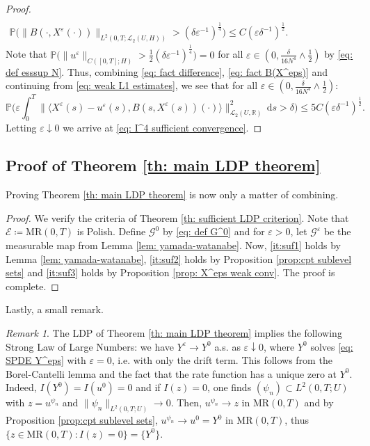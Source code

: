 \documentclass{amsart}
\newcommand{\dd}{\,\mathrm{d}}
\renewcommand{\MR}{\mathrm{MR}}
\newcommand{\UH}{\mathcal{L}_2(U,H)}
\newcommand{\<}{\langle}
\newcommand{\?}{\rangle}
\theoremstyle{plain}
\theoremstyle{remark}
\newtheorem{remark}[theorem]{Remark}
\theoremstyle{plain}
\numberwithin{equation}{section}
\def\R{{\mathbb R}}
\renewcommand{\P}{\mathbb{P}}
\newcommand{\eps}{\varepsilon}
\begin{document}
\begin{proof}
\begin{align}
      \label{eq: fact difference}
      \end{align}
      \begin{align}
    \P\big(\|B(\cdot,X^\eps(\cdot))\|_{L^2(0,T;\UH)}> ({\delta}{\eps}^{-1})^{\frac{1}{4}}\big)\leq C({\eps}{\delta}^{-1})^{\frac{1}{2}}.\hspace{5cm} \label{eq: fact B(X^eps)}
    \end{align}
    Note that  $\P\big(\|u^{\eps}\|_{C([0,T];H)}>\tfrac{1}{2}({\delta}{\eps}^{-1})^{\frac{1}{4}}\big)=0$ for all $\eps\in(0,\frac{\delta}{16N^4}\wedge \frac{1}{2})$ by \eqref{eq: def esssup N}.
Thus, combining \eqref{eq: fact difference}, \eqref{eq: fact B(X^eps)} and continuing from \eqref{eq: weak L1 estimates}, we see that for all $\eps\in(0,\frac{\delta}{16N^4}\wedge \frac{1}{2})$:
\[
\P\Big(\eps\int_0^T\|\<X^\eps(s)-u^{\eps}(s),B(s,X^\eps(s))(\cdot)\?\|_{\mathcal{L}_2(U,\R)}^2\dd s>\delta\Big)\leq 5C({\eps}{\delta}^{-1})^{\frac{1}{2}}.
\]
Letting $\eps\downarrow 0$ we arrive at \eqref{eq: I^4 sufficient convergence}.
\end{proof}







\subsection{Proof of Theorem \ref{th: main LDP theorem}}

Proving Theorem \ref{th: main LDP theorem} is now only a matter of combining.

\begin{proof}
  We verify the criteria of Theorem \ref{th: sufficient LDP criterion}. Note that $\mathcal{E}\coloneqq \MR(0,T)$ is Polish.
  Define $\mathcal{G}^0$ by \eqref{eq: def G^0} and for $\eps>0$, let $\mathcal{G}^\eps$ be the measurable map from Lemma \ref{lem: yamada-watanabe}.
  Now, \ref{it:suf1} holds by Lemma \ref{lem: yamada-watanabe}, \ref{it:suf2} holds by Proposition \ref{prop:cpt sublevel sets} and \ref{it:suf3} holds by Proposition \ref{prop: X^eps weak conv}. The proof is complete.
\end{proof}

Lastly, a small remark.

\begin{remark}\label{rem: LLN}
The LDP of Theorem \ref{th: main LDP theorem} implies the following Strong Law of Large Numbers: we have $Y^\eps\to Y^0$ a.s. \!as $\eps\downarrow0$, where $Y^0$ solves \eqref{eq: SPDE Y^eps} with $\eps=0$, i.e. with only the drift term. This follows from the Borel-Cantelli lemma and the fact that the rate function has a unique zero at $Y^0$. Indeed, $I(Y^0)=I(u^0)=0$ and if $I(z)=0$, one finds $(\psi_n)\subset L^2(0,T;U)$ with $z=u^{\psi_n}$ and $\|\psi_n\|_{L^2(0,T;U)}\to 0$. Then, $u^{\psi_n}\to z$ in $\MR(0,T)$ and by Proposition \ref{prop:cpt sublevel sets}, $u^{\psi_n}\to u^0=Y^0$ in $\MR(0,T)$, thus $\{z\in \MR(0,T):I(z)=0\}=\{Y^0\}$.
\end{remark}
\end{document}
